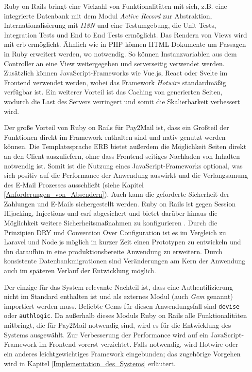 Ruby on Rails bringt eine Vielzahl von Funktionalitäten mit sich, z.B. eine integrierte Datenbank mit dem Modul \textit{Active Record} zur Abstraktion, Internationalisierung mit \textit{I18N} und eine Testumgebung, die Unit Tests, Integration Tests und End to End Tests ermöglicht. Das Rendern von Views wird mit \acrfull{erb} ermöglicht. Ähnlich wie in PHP können HTML-Dokumente um Passagen in Ruby erweitert werden, wo notwendig. So können Instanzvariablen aus dem Controller an eine View weitergegeben und serverseitig verwendet werden. Zusätzlich können JavaScript-Frameworks wie Vue.js, React oder Svelte im Frontend verwendet werden, wobei das Framework \textit{Hotwire} standardmäßig verfügbar ist. Ein weiterer Vorteil ist das Caching von generierten Seiten, wodurch die Last des Servers verringert und somit die Skalierbarkeit verbessert wird.

Der große Vorteil von Ruby on Rails für Pay2Mail ist, dass ein Großteil der Funktionen direkt im Framework enthalten sind und nativ genutzt werden können. Die Templatesprache ERB bietet außerdem die Möglichkeit Seiten direkt an den Client auszuliefern, ohne dass Frontend-seitiges Nachladen von Inhalten notwendig ist. Somit ist die Nutzung eines JavaScript-Frameworks optional, was sich positiv auf die Performance der Anwendung auswirkt und die Verlangsamung des E-Mail Prozesses ausschließt (siehe Kapitel \ref{Anforderungen_von_Absendern}). Auch kann die geforderte Sicherheit der Zahlungen und E-Mails sichergestellt werden. Ruby on Rails ist gegen Session Hijacking, Injections und \acrfull{csrf} abgesichert und bietet darüber hinaus die Möglichkeit weitere Sicherheitsmaßnahmen zu konfigurieren \citep{Hansson2022}. Durch die Prinzipien DRY und Convention Over Configuration ist es im Vergleich zu Laravel und Node.js möglich in kurzer Zeit einen Prototypen zu entwickeln und ihn daraufhin in eine produktionsbereite Anwendung zu erweitern. Durch konsistente Datenbankmigrationen sind Veränderungen am Kern der Anwendung auch im späteren Verlauf der Entwicklung möglich.

Der einzige für das System relevante Nachteil ist, dass eine Authentifizierung nicht im Standard enthalten ist und als externes Modul (auch \textit{Gem} genannt) importiert werden muss. Beliebte Gems für diesen Anwendungsfall sind \texttt{devise} oder \texttt{authlogic}. Da außerhalb dieses Moduls Ruby on Rails alle Funktionalitäten mitbringt, die für Pay2Mail notwendig sind, wird es für die Entwicklung des Systems ausgewählt. Zur Verbesserung der Performance wird auf ein JavaScript-Framework im Frontend vorerst verzichtet. Falls notwendig, wird Hotwire oder ein anderes leichtgewichtiges Framework eingebunden; das zugehörige Vorgehen wird in Kapitel \ref{Implementation_des_Systems} erläutert.